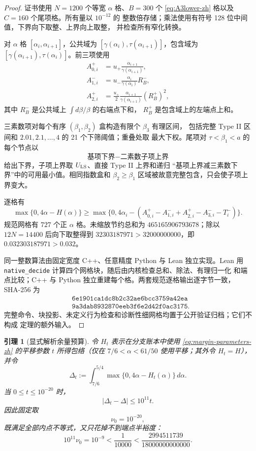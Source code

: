 \documentclass[UTF8,10pt,a4paper]{ctexart}
\newcommand{\1}{\mathbf{1}}
\newtheorem{lemma}[theorem]{引理}
\theoremstyle{remark}
\begin{document}
\begin{proof}
证书使用 $N=1200$ 个等宽 $\alpha$ 格、$B=300$ 个
\eqref{eq:A3lower-zh} 格以及 $C=160$ 个尾项格。所有量以 $10^{-12}$ 的
整数倍存储；乘法使用有符号 128 位中间值，下界向下取整、上界向上取整，
并检查所有窄化转换。

对 $\alpha$ 格 $[\alpha_i,\alpha_{i+1}]$，公共域为
$[\gamma(\alpha_i),\tau(\alpha_{i+1})]$，包含域为
$[\gamma(\alpha_{i+1}),\tau(\alpha_i)]$。前三项使用
\begin{align*}
 A_{0,i}^{+}&=u_+\frac{\alpha_{i+1}}{\gamma(\alpha_{i+1})},\\
 A_{1,i}^{-}&=u_-\frac{\alpha_i}{\gamma(\alpha_i)}R^-_B,\\
 A_{2,i}^{+}&=\frac{u_+}{2}
 \frac{\alpha_{i+1}}{\gamma(\alpha_{i+1})}(R^+_B)^2,
\end{align*}
其中 $R^-_B$ 是公共域上 $\int d\beta/\beta$ 的右端点下和，
$R^+_B$ 是包含域上的左端点上和。

三素数项对每个有序 $(\beta_1,\beta_2)$ 盒构造有限个 $\beta_3$ 有理区间，
包括完整 Type II 区间和 $2.01,2.1,\ldots,4$ 的 21 个下筛阈值；重叠处取
最大下权。尾项对 $\tau<\beta_1<a$ 的每个节点以
\[
 \text{基项下界}-\text{二素数子项上界}
\]
给出下界，子项上界取 $U_{\rm LS}$、直接 Type II 上界和递归
“基项上界减三素数下界”中的可用最小值。相同指数盒和 $\beta_2\ge\beta_1$
区域被故意完整包含，只会使子项上界变大。

逐格有
\[
 \max\{0,4\alpha-H(\alpha)\}
 \ge \max\{0,4\alpha_i-
 (A_{0,i}^{+}-A_{1,i}^{-}+A_{2,i}^{+}
 -A_{3,i}^{-}-T_i^{-})\}.
\]
规范网格有 $727$ 个正 $\alpha$ 格。未缩放节约总和为
$465165906793678$；除以 $12N=14400$ 后向下取整得到
$32303187971>32000000000$，即 $0.032303187971>0.032$。

同一整数算法由固定宽度 C++、任意精度 Python 与 Lean 独立实现。Lean 用
\texttt{native\_decide} 计算四个网格块，随后由内核检查总和、除法、有理归一化
和端点比较；C++ 与 Python 独立重建每个格。两套规范逐格输出逐字节一致，
SHA-256 为
\[
\begin{aligned}
&\texttt{6e1901ca1dc8b2c32ae6bcc3759a42ea}\\
&\texttt{9a3dab8932870eeb3f6e2d42f0ac3175}.
\end{aligned}
\]
完整命令、块投影、未定义行为检查和诊断性细网格均置于公开验证归档；它们不构成
定理的额外输入。
\end{proof}

\begin{lemma}[显式解析余量预算]\label{lem:explicit-margin-zh}
令 $H_t$ 表示在分支账本中使用 \eqref{eq:margin-parameters-zh} 的平移参数 $t$
所得包络（仅在 $7/6<\alpha<61/50$ 使用平移；其外令 $H_t=H$），并令
\[
 \Delta_t:=\int_{7/6}^{5/4}\max\{0,4\alpha-H_t(\alpha)\}\,d\alpha.
\]
当 $0\le t\le10^{-20}$ 时，
\begin{equation}\label{eq:explicit-margin-loss-zh}
 |\Delta_t-\Delta|\le10^{11}t.
\end{equation}
因此固定取
\begin{equation}\label{eq:explicit-nu-zh}
 \nu_0=10^{-20},
\end{equation}
既满足全部内点不等式，又只花掉不到端点半裕度：
\[
 10^{11}\nu_0=10^{-9}<\frac1{10000}
 <\frac{2994511739}{18000000000000}.
\]
\end{lemma}
\end{document}
